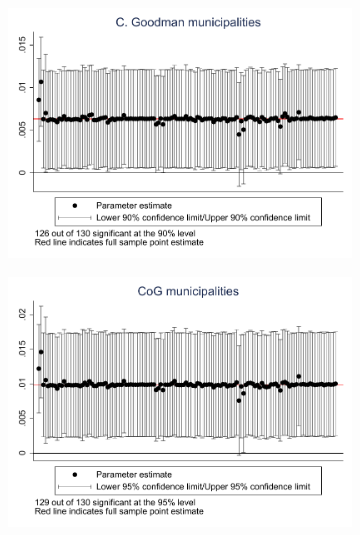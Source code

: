 \documentclass{article}
\begin{document}
\begin{landscape}
\clearpage
\begin{figure}[htbp]
    \centering
    \caption{Leave-one-out IV Tests, Balanced Controls}
    \begin{subfigure}{0.4\textwidth}
        \includegraphics[width=\linewidth]{figures/exogeneity_tests/loo_iv_cgoodman_new_ctrls.pdf}
        \label{fig:sub1}
    \end{subfigure}
    \begin{subfigure}{0.4\textwidth}
        \includegraphics[width=\linewidth]{figures/exogeneity_tests/loo_iv_gen_muni_new_ctrls.pdf}
        \label{fig:sub2}
    \end{subfigure}
    \begin{subfigure}{0.4\textwidth}

\end{subfigure}
\end{figure}
\end{landscape}
\end{document}
